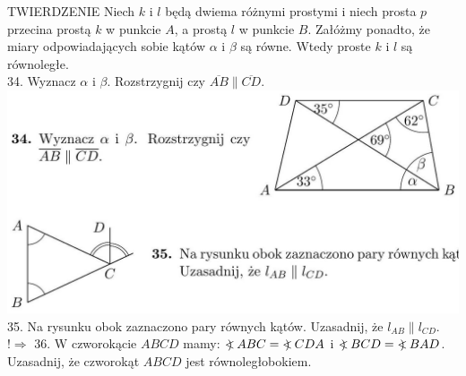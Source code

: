 \documentclass[10pt]{article}
\newcommand\Varangle{\mathop{{<\!\!\!\!\!\text{\small)}}\:}\nolimits}
\begin{document}
TWIERDZENIE Niech \(k\) i \(l\) będą dwiema różnymi prostymi i niech prosta \(p\) przecina prostą \(k\) w punkcie \(A\), a prostą \(l\) w punkcie \(B\). Załóżmy ponadto, że miary odpowiadających sobie kątów \(\alpha\) i \(\beta\) są równe. Wtedy proste \(k\) i \(l\) są równoległe.\\
34. Wyznacz \(\alpha\) i \(\beta\). Rozstrzygnij czy \(\overline{A B} \| \overline{C D}\).\\
\includegraphics[max width=\textwidth, center]{2024_11_21_71f62bd117d375398909g-026(1)}\\
35. Na rysunku obok zaznaczono pary równych kątów. Uzasadnij, że \(l_{A B} \| l_{C D}\).\\
\(!\Rightarrow\) 36. W czworokącie \(A B C D\) mamy: \(\Varangle A B C=\Varangle C D A\) i \(\Varangle B C D=\Varangle B A D\). Uzasadnij, że czworokąt \(A B C D\) jest równoległobokiem.
\end{document}
